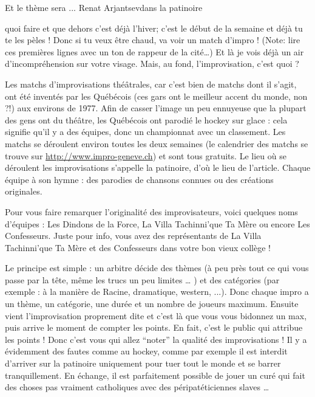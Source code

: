 \vspace*{-3mm}
\begin{article*}
{Et le thème sera ...}
{Renat Arjantsev}{dans la patinoire}

\begin{spacing}{1.04}
 quoi faire et que dehors c’est déjà l’hiver; c’est le début de la semaine et déjà tu te les pèles ! Donc si tu veux être chaud, va voir un match d’impro ! (Note: lire ces premières lignes avec un ton de rappeur de la cité…) Et là je vois déjà un air d’incompréhension sur votre visage. Mais, au fond, l’improvisation, c’est quoi ?

Les matchs d’improvisations théâtrales, car c’est bien de matchs dont il s’agit, ont été inventés par les Québécois (ces gars ont le meilleur accent du monde, non ?!) aux environs de 1977. Afin de casser l’image un peu ennuyeuse que la plupart des gens ont du théâtre, les Québécois ont parodié le hockey sur glace : cela signifie qu’il y a des équipes, donc un championnat avec un classement. Les matchs se déroulent environ toutes les deux semaines (le calendrier des matchs se trouve sur \url{http://www.impro-geneve.ch}) et sont tous gratuits. Le lieu où se déroulent les improvisations s’appelle la patinoire, d’où le lieu de l’article. Chaque équipe à son hymne : des parodies de chansons connues ou des créations originales.

Pour vous faire remarquer l’originalité des improvisateurs, voici quelques noms d’équipes : Les Dindons de la Force, La Villa Tachinni’que Ta Mère ou encore Les Confesseurs. Juste pour info, vous avez des représentants de La Villa Tachinni’que Ta Mère et des Confesseurs dans votre bon vieux collège !


Le principe est simple : un arbitre décide des thèmes (à peu près tout ce qui vous passe par la tête, même les trucs un peu limites … ) et des catégories (par exemple : à la manière de Racine, dramatique, western, ...). Donc chaque impro a un thème, un catégorie, une durée et un nombre de joueurs maximum. Ensuite vient l’improvisation proprement dite et c’est là que vous vous bidonnez un max, puis arrive le moment de compter les points. En fait, c’est le public qui attribue les points ! Donc c’est vous qui allez \enquote{noter} la qualité des improvisations !
Il y a évidemment des fautes comme au hockey, comme par exemple il est interdit d’arriver sur la patinoire uniquement pour tuer tout le monde et se barrer tranquillement. En échange, il est parfaitement possible de jouer un curé qui fait des choses pas vraiment catholiques avec des péripatéticiennes slaves …


\end{spacing}
\end{article*}

